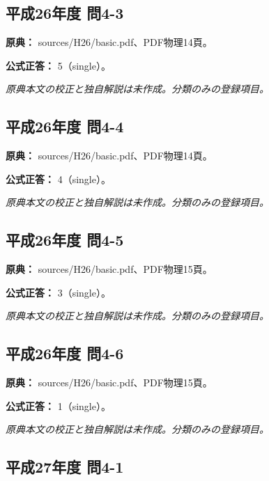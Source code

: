 \subsection{平成26年度 問4-3}
\label{q:h26-reg-basic-4-3}

\noindent\textbf{原典：} sources/H26/basic.pdf、PDF物理14頁。

\textbf{公式正答：} 5（single）。

\par\textit{原典本文の校正と独自解説は未作成。分類のみの登録項目。}

\subsection{平成26年度 問4-4}
\label{q:h26-reg-basic-4-4}

\noindent\textbf{原典：} sources/H26/basic.pdf、PDF物理14頁。

\textbf{公式正答：} 4（single）。

\par\textit{原典本文の校正と独自解説は未作成。分類のみの登録項目。}

\subsection{平成26年度 問4-5}
\label{q:h26-reg-basic-4-5}

\noindent\textbf{原典：} sources/H26/basic.pdf、PDF物理15頁。

\textbf{公式正答：} 3（single）。

\par\textit{原典本文の校正と独自解説は未作成。分類のみの登録項目。}

\subsection{平成26年度 問4-6}
\label{q:h26-reg-basic-4-6}

\noindent\textbf{原典：} sources/H26/basic.pdf、PDF物理15頁。

\textbf{公式正答：} 1（single）。

\par\textit{原典本文の校正と独自解説は未作成。分類のみの登録項目。}

\subsection{平成27年度 問4-1}
\label{q:h27-reg-basic-4-1}

